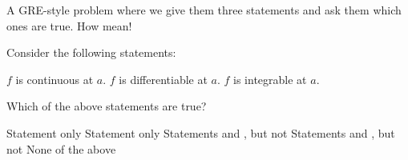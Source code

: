 \documentclass[10pt, letterpaper]{article}
\begin{document}
  \begin{problem}{1}
    A GRE-style problem where we give them three statements and ask them
    which ones are true. How mean!

    Consider the following statements:

    \begin{statements}
      \statement{} $f$ is continuous at $a$.
      \statement{} $f$ is differentiable at $a$.
      \statement{} $f$ is integrable at $a$.
    \end{statements}

    Which of the above statements are true?

    \begin{choices}
      \choice{} Statement  only
      \choice{} Statement  only
      \choice{} Statements  and , but not 
      \choice{} Statements  and , but not 
      \choice{} None of the above
    \end{choices}

  \end{problem}
\end{document}
